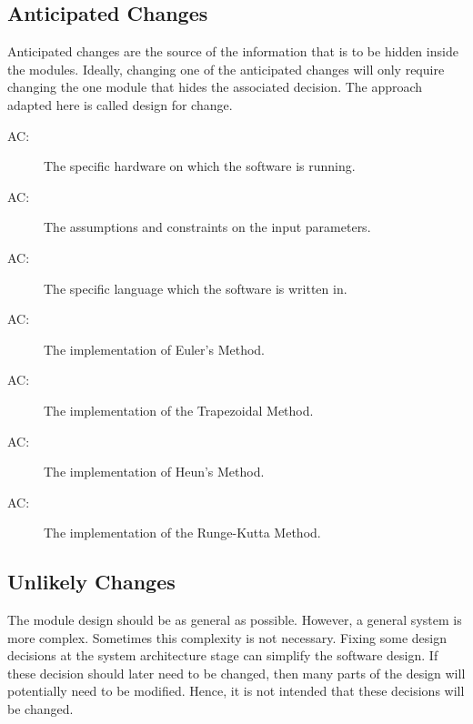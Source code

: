 \documentclass[12pt, titlepage]{article}
\newcounter{acnum}
\newcommand{\actheacnum}{AC\theacnum}
\begin{document}
\subsection{Anticipated Changes} \label{SecAchange}

Anticipated changes are the source of the information that is to be hidden
inside the modules. Ideally, changing one of the anticipated changes will only
require changing the one module that hides the associated decision. The approach
adapted here is called design for change.

\begin{description}
\item[ \actheacnum \label{acHardware}:] The specific
  hardware on which the software is running.
\item[ \actheacnum \label{acConstraints}:] The assumptions and constraints
on the input parameters.
\item[ \actheacnum \label{acLanguage}:] The specific language
which the software is written in.
\item[ \actheacnum \label{acEulerMethod}:] The implementation
of Euler's Method.
\item[ \actheacnum \label{acTrapMethod}:] The implementation
of the Trapezoidal Method.
\item[ \actheacnum \label{acHeunMethod}:] The implementation
of Heun's Method.
\item[ \actheacnum \label{acRKMethod}:] The implementation
of the Runge-Kutta Method.
\end{description}

\subsection{Unlikely Changes} \label{SecUchange}

The module design should be as general as possible. However, a general system is
more complex. Sometimes this complexity is not necessary. Fixing some design
decisions at the system architecture stage can simplify the software design. If
these decision should later need to be changed, then many parts of the design
will potentially need to be modified. Hence, it is not intended that these
decisions will be changed.
\end{document}
